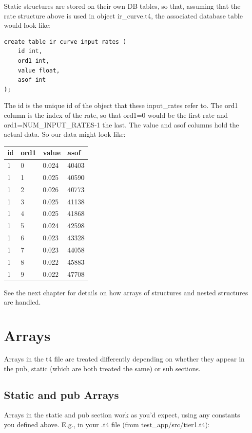 \documentclass{report}
\begin{document}
Static structures are stored on their own DB tables, so that, assuming that the rate structure above is used in object ir_curve.t4, the associated database table would look like:

\begin{verbatim}
create table ir_curve_input_rates (
    id int,
    ord1 int,
    value float,
    asof int
);
\end{verbatim}

The id is the unique id of the object that these input_rates refer to. The ord1 column is the index of the rate, so that ord1=0 would be the first rate and ord1=NUM_INPUT_RATES-1 the last. The value and asof columns hold the actual data. So our data might look like:

\begin {tabular} {| l | l | l | l |}
\hline
id & ord1 & value & asof \\
\hline
1 & 0 & 0.024 & 40403 \\
\hline
1 & 1 & 0.025 & 40590 \\
\hline
1 & 2 & 0.026 & 40773 \\
\hline
1 & 3 & 0.025 & 41138 \\
\hline
1 & 4 & 0.025 & 41868 \\
\hline
1 & 5 & 0.024 & 42598 \\
\hline
1 & 6 & 0.023 & 43328 \\
\hline
1 & 7 & 0.023 & 44058 \\
\hline
1 & 8 & 0.022 & 45883 \\
\hline
1 & 9 & 0.022 & 47708 \\
\hline
\end {tabular}

See the next chapter for details on how arrays of structures and nested structures are handled.




\section{Arrays}

Arrays in the t4 file are treated differently depending on whether they appear in the pub, static (which are both treated the same) or sub sections. 

\subsection{Static and pub Arrays}

Arrays in the static and pub section work as you'd expect, using any constants you defined above. E.g., in your .t4 file (from test_app/src/tier1.t4):
\end{document}

